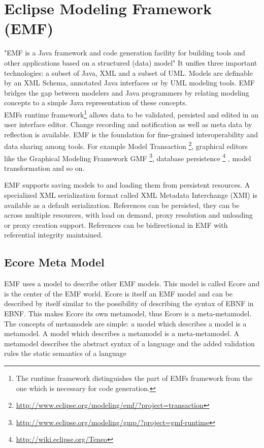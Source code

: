 \chapter{Eclipse Modeling Framework (EMF)}
"EMF is a Java framework and code generation facility for building tools and other applications based on a structured (data) model" \cite{EMFDoc}
 It unifies three important technologies: a subset of Java, XML and a subset of UML. Models are definable by an XML Schema, annotated Java interfaces or by UML modeling tools. EMF bridges the gap between modelers and Java programmers by relating modeling concepts to a simple Java representation of these concepts. \cite{EMF2nd}\\

EMFs runtime framework\footnote{\raggedright The runtime framework distinguishes the part of EMFs framework from the one which is necessary for code generation.}  allows data to be validated, persisted and edited in an user interface editor. Change recording and notification as well as meta data by reflection is available. EMF is the foundation for fine-grained interoperability and data sharing among tools. For example Model Transaction \footnote{\raggedright \url{http://www.eclipse.org/modeling/emf/?project=transaction}}, graphical editors like the Graphical Modeling Framework GMF \footnote{\raggedright \url{http://www.eclipse.org/modeling/gmp/?project=gmf-runtime}}, database persistence \footnote{\raggedright \url{http://wiki.eclipse.org/Teneo}} , model transformation and so on.

EMF supports saving models to and loading them from persistent resources. A specialized XML serialization format called XML Metadata Interchange (XMI) is available as a default serialization. References can be persisted, they can be across multiple resources, with load on demand, proxy resolution and unloading or proxy creation support. References can be bidirectional in EMF with referential integrity maintained. \cite{EMF2nd}\\

\section{Ecore Meta Model} \label{ecore}
EMF uses a model to describe other EMF models. This model is called Ecore and is the center of the EMF world. Ecore is itself an EMF model and can be described by itself similar to the possibility of describing the syntax of EBNF in EBNF. This makes Ecore its own metamodel, thus Ecore is a meta-metamodel. The concepts of metamodels are simple: a model which describes a model is a metamodel. A model which describes a metamodel is a meta-metamodel. \cite{EMF2nd}  A metamodel describes the abstract syntax of a language \cite{EMP} and the added validation rules the static semantics of a language \cite{MDSD}

